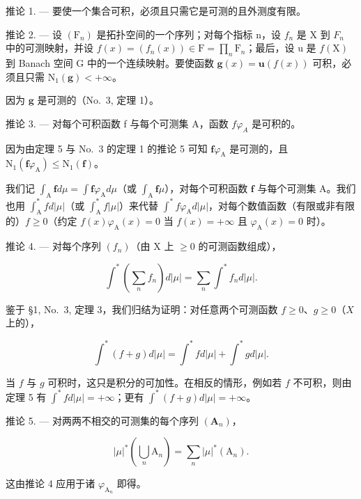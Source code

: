 推论 1. --- 要使一个集合可积，必须且只需它是可测的且外测度有限。

推论 2. --- 设 \((\mathrm{F}_{n})\) 是拓扑空间的一个序列；对每个指标 n，设 \(f_{n}\) 是 X 到 \(F_{n}\) 中的可测映射，并设 \(f(x) = (f_{n}(x)) \in \mathrm{F} = \prod_{n} \mathrm{F}_{n}\)；最后，设 u 是 \(f(\mathrm{X})\) 到 Banach 空间 G 中的一个连续映射。要使函数 \(\mathbf{g}(x) = \mathbf{u}(f(x))\) 可积，必须且只需 \(\mathrm{N}_{1}(\mathbf{g}) < +\infty\)。

因为 \(\mathbf{g}\) 是可测的（No.~3, 定理 1）。

推论 3. --- 对每个可积函数 f 与每个可测集 A，函数 \(f\varphi_{A}\) 是可积的。

因为由定理 5 与 No.~3 的定理 1 的推论 5 可知 \(\mathbf{f}\varphi_{\mathrm{A}}\) 是可测的，且 \(\mathrm{N}_1(\mathbf{f}\varphi_{\mathrm{A}}) \leqslant \mathrm{N}_1(\mathbf{f})\)。

我们记 \(\int_{\mathrm{A}} \mathbf{f} d\mu = \int \mathbf{f} \varphi_{\mathrm{A}} d\mu\)（或 \(\int_{\mathrm{A}} \mathbf{f} \mu\)），对每个可积函数 \(\mathbf{f}\) 与每个可测集 \(\mathrm{A}\)。我们也用 \(\int_{\mathrm{A}}^{*} f d|\mu|\)（或 \(\int_{\mathrm{A}}^{*} f |\mu|\)）来代替 \(\int^{*} f \varphi_{\mathrm{A}} d|\mu|\)，对每个数值函数（有限或非有限的）\(f \geqslant 0\)（约定 \(f(x) \varphi_{\mathrm{A}}(x) = 0\) 当 \(f(x) = +\infty\) 且 \(\varphi_{\mathrm{A}}(x) = 0\) 时）。

推论 4. --- 对每个序列 \((f_{n})\)（由 X 上 \(\geqslant 0\) 的可测函数组成），

\[
\int^ {*} \left(\sum_ {n} f _ {n}\right) d | \mu | = \sum_ {n} \int^ {*} f _ {n} d | \mu |.\tag{1}
\]

鉴于 §1, No.~3, 定理 3，我们归结为证明：对任意两个可测函数 \(f \geqslant 0\)、\(g \geqslant 0\)（\(X\) 上的），

\[
\int^ {*} (f + g) d | \mu | = \int^ {*} f d | \mu | + \int^ {*} g d | \mu |.\tag{2}
\]

当 \(f\) 与 \(g\) 可积时，这只是积分的可加性。在相反的情形，例如若 \(f\) 不可积，则由定理 5 有 \(\int^{*} f d|\mu| = +\infty\)；更有 \(\int^{*}(f + g) d|\mu| = +\infty\)。

推论 5. --- 对两两不相交的可测集的每个序列 \((\mathbf{A}_{n})\)，

\[
| \mu | ^ {*} \left(\bigcup_ {n} \mathrm{A} _ {n}\right) = \sum_ {n} | \mu | ^ {*} (\mathrm{A} _ {n}).
\]

这由推论 4 应用于诸 \(\varphi_{\mathrm{A}_n}\) 即得。
\relax{}
